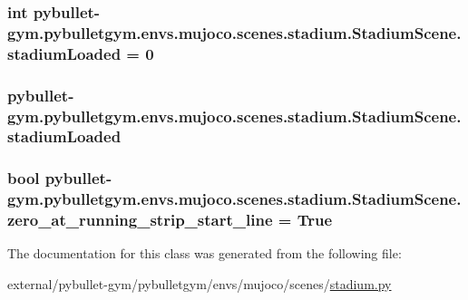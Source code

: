 \subsubsection[{\texorpdfstring{stadium\+Loaded}{stadiumLoaded}}]{\setlength{\rightskip}{0pt plus 5cm}int pybullet-\/gym.\+pybulletgym.\+envs.\+mujoco.\+scenes.\+stadium.\+Stadium\+Scene.\+stadium\+Loaded = 0\hspace{0.3cm}{\ttfamily [static]}}\hypertarget{classpybullet-gym_1_1pybulletgym_1_1envs_1_1mujoco_1_1scenes_1_1stadium_1_1_stadium_scene_a5d8f8c24987b0022ee450e981757a02e}{}\label{classpybullet-gym_1_1pybulletgym_1_1envs_1_1mujoco_1_1scenes_1_1stadium_1_1_stadium_scene_a5d8f8c24987b0022ee450e981757a02e}
\subsubsection[{\texorpdfstring{stadium\+Loaded}{stadiumLoaded}}]{\setlength{\rightskip}{0pt plus 5cm}pybullet-\/gym.\+pybulletgym.\+envs.\+mujoco.\+scenes.\+stadium.\+Stadium\+Scene.\+stadium\+Loaded}\hypertarget{classpybullet-gym_1_1pybulletgym_1_1envs_1_1mujoco_1_1scenes_1_1stadium_1_1_stadium_scene_a16e5a8e3db8ddabec3d9e47e8a63d53c}{}\label{classpybullet-gym_1_1pybulletgym_1_1envs_1_1mujoco_1_1scenes_1_1stadium_1_1_stadium_scene_a16e5a8e3db8ddabec3d9e47e8a63d53c}
\subsubsection[{\texorpdfstring{zero\+\_\+at\+\_\+running\+\_\+strip\+\_\+start\+\_\+line}{zero_at_running_strip_start_line}}]{\setlength{\rightskip}{0pt plus 5cm}bool pybullet-\/gym.\+pybulletgym.\+envs.\+mujoco.\+scenes.\+stadium.\+Stadium\+Scene.\+zero\+\_\+at\+\_\+running\+\_\+strip\+\_\+start\+\_\+line = True\hspace{0.3cm}{\ttfamily [static]}}\hypertarget{classpybullet-gym_1_1pybulletgym_1_1envs_1_1mujoco_1_1scenes_1_1stadium_1_1_stadium_scene_a66c20745e5b8101bc51d8b3bd4d36a8d}{}\label{classpybullet-gym_1_1pybulletgym_1_1envs_1_1mujoco_1_1scenes_1_1stadium_1_1_stadium_scene_a66c20745e5b8101bc51d8b3bd4d36a8d}


The documentation for this class was generated from the following file\+:\begin{DoxyCompactItemize}
\item 
external/pybullet-\/gym/pybulletgym/envs/mujoco/scenes/\hyperlink{mujoco_2scenes_2stadium_8py}{stadium.\+py}\end{DoxyCompactItemize}
